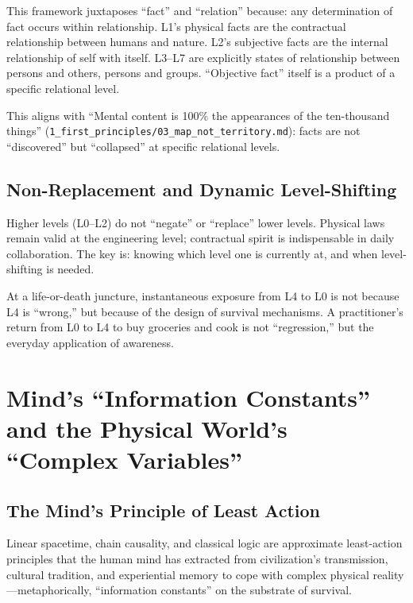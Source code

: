 \documentclass[11pt,a4paper]{article}
\begin{document}
This framework juxtaposes ``fact'' and ``relation'' because: any determination of fact occurs within relationship. L1's physical facts are the contractual relationship between humans and nature. L2's subjective facts are the internal relationship of self with itself. L3--L7 are explicitly states of relationship between persons and others, persons and groups. ``Objective fact'' itself is a product of a specific relational level.

This aligns with ``Mental content is 100\% the appearances of the ten-thousand things'' (\texttt{1\_first\_principles/03\_map\_not\_territory.md}): facts are not ``discovered'' but ``collapsed'' at specific relational levels.

\subsection{Non-Replacement and Dynamic Level-Shifting}

Higher levels (L0--L2) do not ``negate'' or ``replace'' lower levels. Physical laws remain valid at the engineering level; contractual spirit is indispensable in daily collaboration. The key is: knowing which level one is currently at, and when level-shifting is needed.

At a life-or-death juncture, instantaneous exposure from L4 to L0 is not because L4 is ``wrong,'' but because of the design of survival mechanisms. A practitioner's return from L0 to L4 to buy groceries and cook is not ``regression,'' but the everyday application of awareness.

\section{Mind's ``Information Constants'' and the Physical World's ``Complex Variables''}

\subsection{The Mind's Principle of Least Action}

Linear spacetime, chain causality, and classical logic are approximate least-action principles that the human mind has extracted from civilization's transmission, cultural tradition, and experiential memory to cope with complex physical reality---metaphorically, ``information constants'' on the substrate of survival.
\end{document}
